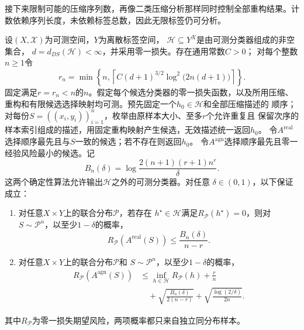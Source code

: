 接下来限制可能的压缩序列数，再像二类压缩分析那样同时控制全部重构结果。计数依赖序列长度，未依赖标签总数，因此无限标签仍可分析。

\begin{theorem}[有限DS维的期望风险保证]
\label{thm:finite-ds-learning-rates}
设$(X,\mathcal X)$为可测空间，$Y$为离散标签空间，
$\mathcal H\subseteq Y^X$是由可测分类器组成的非空集合，
$d=d_{DS}(\mathcal H)<\infty$，并采用零一损失。存在通用常数$C>0$；
对每个整数$n\geq1$令
\[
 r_n=\min\!\left\{n,\left\lceil
 C(d+1)^{3/2}\log^2\!\bigl(2n(d+1)\bigr)\right\rceil\right\}.
\]
固定满足$r=r_n<n$的$n$。假定每个候选分类器的零一损失函数，以及所用压缩、
重构和有限候选选择映射均可测。预先固定一个$h_0\in\mathcal H$和全部压缩描述的
顺序；对每份$S=((x_i,y_i))_{i=1}^n$，枚举由原样本大小、至多$r$个允许重复且
保留次序的样本索引组成的描述，用固定重构映射产生候选，无效描述统一返回$h_0$。
令$A^{\mathrm{real}}$选择顺序最先且与$S$一致的候选；若不存在则返回$h_0$。
令$A^{\mathrm{agn}}$选择顺序最先且零一经验风险最小的候选。记
\[
 B_n(\delta)=\log\frac{2(n+1)(r+1)n^r}{\delta}.
\]
这两个确定性算法允许输出$\mathcal H$之外的可测分类器。对任意
$\delta\in(0,1)$，以下保证成立：
\begin{enumerate}
\item 对任意$X\times Y$上的联合分布$\mathcal P$，若存在
$h^\star\in\mathcal H$满足$R_{\mathcal P}(h^\star)=0$，则对
$S\sim\mathcal P^n$，以至少$1-\delta$的概率，
 \[
 R_{\mathcal P}(A^{\mathrm{real}}(S))
 \leq\frac{B_n(\delta)}{n-r}.
 \]
\item 对任意$X\times Y$上的联合分布$\mathcal P$和
$S\sim\mathcal P^n$，以至少$1-\delta$的概率，
 \begin{align*}
 R_{\mathcal P}(A^{\mathrm{agn}}(S))
 &\leq\inf_{h\in\mathcal H}R_{\mathcal P}(h)+\frac rn\\
 &\quad+\sqrt{\frac{B_n(\delta)}{2(n-r)}}
       +\sqrt{\frac{\log(2/\delta)}{2n}}.
 \end{align*}
\end{enumerate}
其中$R_{\mathcal P}$为零一损失期望风险，两项概率都只来自独立同分布样本。
\end{theorem}

